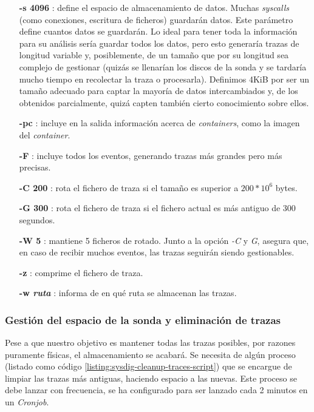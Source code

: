 \begin{itemize}
    \item[\textbf{-s 4096}]: define el espacio de almacenamiento de datos. Muchas \emph{syscalls} (como conexiones, escritura de ficheros) guardarán datos. Este parámetro define 
    cuantos datos se guardarán. Lo ideal para tener toda la información para su análisis sería guardar todos los datos, pero esto generaría trazas de longitud variable 
    y, posiblemente, de un tamaño que por su longitud sea complejo de gestionar (quizás se llenarían los discos de la sonda y se tardaría mucho tiempo en recolectar la traza o procesarla). 
    Definimos 4KiB por ser un tamaño adecuado para captar la mayoría de datos intercambiados y, de los obtenidos parcialmente, quizá capten también cierto conocimiento sobre ellos. 
    \item[\textbf{-pc}]: incluye en la salida información acerca de \emph{containers}, como la imagen del \emph{container}.
    \item[\textbf{-F}]: incluye todos los eventos, generando trazas más grandes pero más precisas.
    \item[\textbf{-C 200}]: rota el fichero de traza si el tamaño es superior a $200 * 10^6$ bytes.
    \item[\textbf{-G 300}]: rota el fichero de traza si el fichero actual es más antiguo de 300 segundos.
    \item[\textbf{-W 5}]: mantiene 5 ficheros de rotado. Junto a la opción \emph{-C} y \emph{G}, asegura que, en caso
    de recibir muchos eventos, las trazas seguirán siendo gestionables.
    \item[\textbf{-z}]: comprime el fichero de traza.
    \item[\textbf{-w \emph{ruta}}]: informa de en qué ruta se almacenan las trazas.
\end{itemize}

   

\subsubsection{Gestión del espacio de la sonda y eliminación de trazas}

Pese a que nuestro objetivo es mantener todas las trazas posibles, por razones puramente físicas,
el almacenamiento se acabará. Se necesita de algún proceso (listado como código \ref{listing:sysdig-cleanup-traces-script}) que se encargue de limpiar las trazas más antiguas, haciendo espacio
a las nuevas. Este proceso se debe lanzar con frecuencia, se ha configurado para ser lanzado cada 2 minutos en un \emph{Cronjob}.

